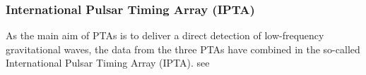 \subsubsection*{International Pulsar Timing Array (IPTA)}
As the main aim of PTAs is to deliver a direct detection of low-frequency gravitational waves, the data from the three PTAs have combined in the so-called International Pulsar Timing Array (IPTA). see \citet{hobbs2010international}


































